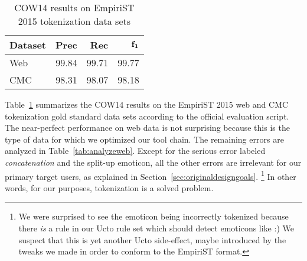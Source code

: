 \documentclass[11pt]{article}
\begin{document}
\begin{table}[!htb]
  \centering
  \begin{tabular}{|l|rrr|}
    \hline
    \textbf{Dataset} & \textbf{Prec} & \textbf{Rec} & $\mathrm{\bf f_1}$ \\
    \hline
    Web & 99.84 & 99.71 & 99.77 \\
    CMC & 98.31 & 98.07 & 98.18 \\
    \hline
  \end{tabular}
  \caption{COW14 results on EmpiriST 2015 tokenization data sets}
  \label{tab:resultstok}
\end{table}

Table~\ref{tab:resultstok} summarizes the COW14 results on the EmpiriST 2015 web and CMC tokenization gold standard data sets according to the official evaluation script.
The near-perfect performance on web data is not surprising because this is the type of data for which we optimized our tool chain.
The remaining errors are analyzed in Table~\ref{tab:analyzeweb}.
Except for the serious error labeled \textit{concatenation} and the split-up emoticon, all the other errors are irrelevant for our primary target users, as explained in Section~\ref{sec:originaldesigngoals}.%
\footnote{We were surprised to see the emoticon being incorrectly tokenized because there \textit{is} a rule in our Ucto rule set which should detect emoticons like :)
We suspect that this is yet another Ucto side-effect, maybe introduced by the tweaks we made in order to conform to the EmpiriST format.}
In other words, for our purposes, tokenization is a solved problem.
\end{document}
